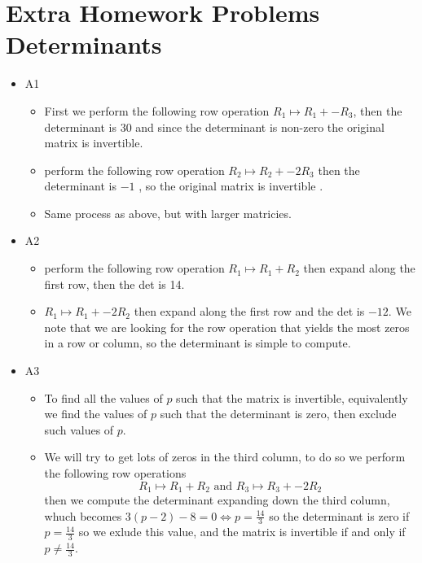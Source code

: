 \documentclass[11pt]{book}
\begin{document}

\section{Extra Homework Problems Determinants}%
\label{sec:extra_homework_problems_determinants}

\begin{itemize}
    \item A1
        \begin{itemize}
            \item First we perform the following  row operation $R_{1} \mapsto R_{1}  + -R_{3} $, then the determinant is 30 and since the determinant is non-zero the original matrix  is invertible.
            \item perform the following row operation $R_{2} \mapsto R_{2}  + -2R_{3} $ then the determinant is $-1$ , so the original matrix is invertible .
            \item Same process as above, but with larger matricies.
        \end{itemize}
    \item A2
        \begin{itemize}
            \item perform the following row operation $R_{1} \mapsto R_{1}  + R_{2} $ then expand along the first row, then the det is 14.
            \item $R_{1} \mapsto R_{1}  + -2R_{2} $ then expand along the first row and the det is $-12$. We note that we are looking for the row operation that yields  the most zeros in a row or column, so the determinant is simple to compute. 
        \end{itemize}
    \item A3
        \begin{itemize}
            \item To find all the values  of $p$ such that the matrix is invertible, equivalently we find the values of $p$ such that the determinant is zero, then exclude such values of $p$.
            \item We will try to get lots of zeros in the third column, to do so we perform the following row operations 
                \[
                R_{1} \mapsto R_{1}  + R_{2} \text{ and } R_{3} \mapsto R_{3}  + -2R_{2} 
                \]
                then we compute the determinant expanding down the third column, whuch becomes $3\left( p - 2 \right)  - 8 = 0 \Leftrightarrow p= \frac{14}{3}$ so the determinant is zero if $p= \frac{14}{3}$ so we exlude this value, and the matrix is invertible if and only if $p\neq \frac{14}{3}$.  

\end{itemize}
\end{itemize}
\end{document}
